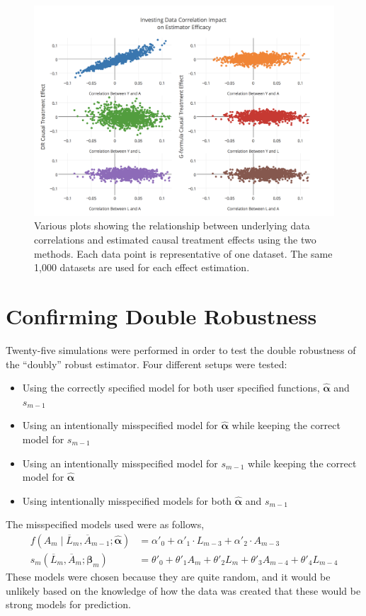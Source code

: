 \begin{figure}[h!]
\includegraphics[width = 1.1\linewidth]{figures/correlation.png}
\caption{Various plots showing the relationship between underlying data correlations and estimated causal treatment effects using the two methods.  Each data point is representative of one dataset.  The same 1,000 datasets are used for each effect estimation.}
\label{correlation}
\end{figure}

\newpage
\section{Confirming Double Robustness} 
Twenty-five simulations were performed in order to test the double robustness of the ``doubly'' robust estimator.  Four different setups were tested: 
\begin{itemize} 
\item Using the correctly specified model for both user specified functions, $\hat{\mathbf{\alpha}}$ and $s_{m-1}$ 
\item Using an intentionally misspecified model for $\hat{\mathbf{\alpha}}$ while keeping the correct model for $s_{m-1}$ 
\item Using an intentionally misspecified model for $s_{m-1}$ while keeping the correct model for $\hat{\mathbf{\alpha}}$
\item Using intentionally misspecified models for both $\hat{\mathbf{\alpha}}$ and $s_{m-1}$ 
\end{itemize} 

The misspecified models used were as follows, 
\begin{align} 
f(A_m \mid \overline{L}_m, \overline{A}_{m-1}; \hat{\mathbf{\alpha}}) &= \alpha'_{0} + \alpha'_{1} \cdot L_{m-3} + \alpha'_{2} \cdot A_{m-3} \\ 
s_{m}(\overline{L}_{m}, \overline{A}_{m};\mathbf{\beta}_{m}) &= \theta'_0 + \theta'_1 A_{m} +\theta'_2 L_m  +\theta'_3 A_{m-4} +  \theta'_4 L_{m-4} 
 \end{align} 
These models were chosen because they are quite random, and it would be unlikely based on the knowledge of how the data was created that these would be strong models for prediction.  

